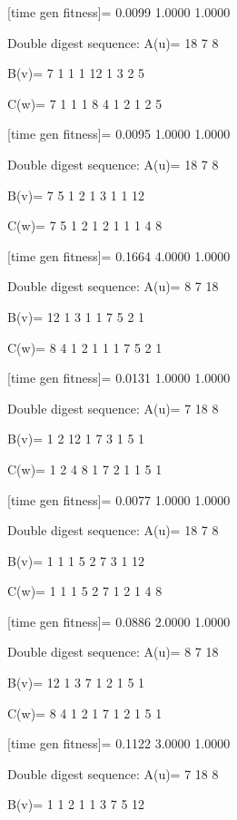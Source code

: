 [time gen fitness]=
    0.0099    1.0000    1.0000

Double digest sequence:
A(u)=
    18     7     8

B(v)=
     7     1     1     1    12     1     3     2     5

C(w)=
     7     1     1     1     8     4     1     2     1     2     5

[time gen fitness]=
    0.0095    1.0000    1.0000

Double digest sequence:
A(u)=
    18     7     8

B(v)=
     7     5     1     2     1     3     1     1    12

C(w)=
     7     5     1     2     1     2     1     1     1     4     8

[time gen fitness]=
    0.1664    4.0000    1.0000

Double digest sequence:
A(u)=
     8     7    18

B(v)=
    12     1     3     1     1     7     5     2     1

C(w)=
     8     4     1     2     1     1     1     7     5     2     1

[time gen fitness]=
    0.0131    1.0000    1.0000

Double digest sequence:
A(u)=
     7    18     8

B(v)=
     1     2    12     1     7     3     1     5     1

C(w)=
     1     2     4     8     1     7     2     1     1     5     1

[time gen fitness]=
    0.0077    1.0000    1.0000

Double digest sequence:
A(u)=
    18     7     8

B(v)=
     1     1     1     5     2     7     3     1    12

C(w)=
     1     1     1     5     2     7     1     2     1     4     8

[time gen fitness]=
    0.0886    2.0000    1.0000

Double digest sequence:
A(u)=
     8     7    18

B(v)=
    12     1     3     7     1     2     1     5     1

C(w)=
     8     4     1     2     1     7     1     2     1     5     1

[time gen fitness]=
    0.1122    3.0000    1.0000

Double digest sequence:
A(u)=
     7    18     8

B(v)=
     1     1     2     1     1     3     7     5    12

